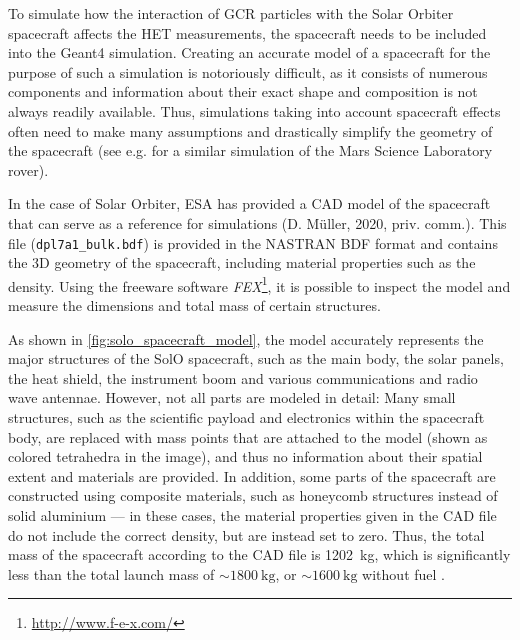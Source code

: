 To simulate how the interaction of \ac{GCR} particles with the Solar Orbiter spacecraft affects the \ac{HET} measurements, the spacecraft needs to be included into the \ac{Geant4} simulation. Creating an accurate model of a spacecraft for the purpose of such a simulation is notoriously difficult, as it consists of numerous components and information about their exact shape and composition is not always readily available. Thus, simulations taking into account spacecraft effects often need to make many assumptions and drastically simplify the geometry of the spacecraft (see e.g. \citet{Appel-2018-PhD,Appel-2018} for a similar simulation of the Mars Science Laboratory rover).

In the case of Solar Orbiter, ESA has provided a \ac{CAD} model of the spacecraft that can serve as a reference for simulations (D. Müller, 2020, priv. comm.). This file (\texttt{dpl7a1\_bulk.bdf}) is provided in the NASTRAN BDF format
and contains the 3D geometry of the spacecraft, including material properties such as the density. Using the freeware software \textit{FEX}\footnote{\url{http://www.f-e-x.com/}}, it is possible to inspect the model and measure the dimensions and total mass of certain structures.

As shown in \autoref{fig:solo_spacecraft_model}, the model accurately represents the major structures of the SolO spacecraft, such as the main body, the solar panels, the heat shield, the instrument boom and various communications and radio wave antennae. However, not all parts are modeled in detail: Many small structures, such as the scientific payload and electronics within the spacecraft body, are replaced with mass points that are attached to the model (shown as colored tetrahedra in the image), and thus no information about their spatial extent and materials are provided. In addition, some parts of the spacecraft are constructed using composite materials, such as honeycomb structures instead of solid aluminium --- in these cases, the material properties given in the \ac{CAD} file do not include the correct density, but are instead set to zero. Thus, the total mass of the spacecraft according to the \ac{CAD} file is \SI{1202}{\kilogram}, which is significantly less than the total launch mass of $\sim\SI{1800}{\kilo\gram}$, or $\sim\SI{1600}{\kilo\gram}$ without fuel \citep{Mueller-2020-SolO}.

